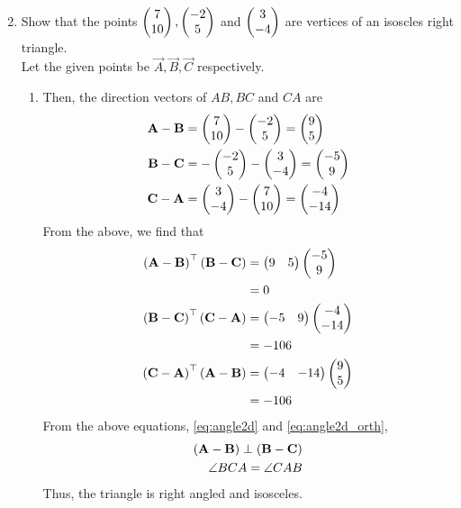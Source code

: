 \documentclass[journal,12pt,twocolumn]{IEEEtran}
\renewcommand\thesection{\arabic{section}}
\begin{document}
\begin{enumerate}[label=\thesection.\arabic*.,ref=\thesection.\theenumi]
\begin{enumerate}
\begin{align}
		\end{align}
		\end{enumerate}
	\item   Show that the points $\begin{pmatrix}7 \\ 10\end{pmatrix}, \begin{pmatrix}-2 \\ 5\end{pmatrix} $ and $\begin{pmatrix}3 \\ -4\end{pmatrix}$ are vertices of an isoscles right triangle.
		\\
		\solution Let the given points be $\vec{A}, \vec{B}, \vec{C}$ respectively. 
		\begin{enumerate}
			\item Then, the direction vectors of $AB, BC$ and $CA$ are
		\begin{align}
			\mathbf{A} -\mathbf{B}&= \begin{pmatrix}7 \\ 10\end{pmatrix} -\begin{pmatrix}-2 \\ 5\end{pmatrix} = \begin{pmatrix}9 \\ 5\end{pmatrix}
			\\
			\mathbf{B} -\mathbf{C}&=  -\begin{pmatrix}-2 \\ 5\end{pmatrix}-\begin{pmatrix}3 \\ -4\end{pmatrix} = \begin{pmatrix}-5 \\ 9\end{pmatrix}
			\\
			\mathbf{C} -\mathbf{A}&= \begin{pmatrix}3 \\ -4\end{pmatrix} -\begin{pmatrix}7 \\ 10\end{pmatrix} = \begin{pmatrix}-4 \\ -14\end{pmatrix}
		\end{align}
		From the above,  we find that 
		\begin{align}
			\left(\mathbf{A} -\mathbf{B}\right)^{\top}\left(\mathbf{B} -\mathbf{C}\right)&=  \begin{pmatrix}9 & 5\end{pmatrix}\begin{pmatrix}-5 \\ 9\end{pmatrix}
			\\
			&=0
			\\
			\left(\mathbf{B} -\mathbf{C}\right)^{\top}\left(\mathbf{C} -\mathbf{A}\right)&=  \begin{pmatrix}-5 & 9\end{pmatrix}\begin{pmatrix}-4 \\ -14\end{pmatrix}
\\
			&=-106
			\\
			\left(\mathbf{C} -\mathbf{A}\right)^{\top}\left(\mathbf{A} -\mathbf{B}\right)&=  \begin{pmatrix}-4 & -14\end{pmatrix}\begin{pmatrix}9 \\ 5\end{pmatrix}
\\
			&=-106
		\end{align}
		From  the above equations, 
    \eqref{eq:angle2d} and 
    \eqref{eq:angle2d_orth},
		\begin{align}
			\left(\mathbf{A} -\mathbf{B}\right)\perp \left(\mathbf{B} -\mathbf{C}\right)
			\\
			\angle BCA = 
			\angle CAB  
		\end{align}
		Thus, the triangle is right angled and isosceles.

\end{enumerate}
\end{enumerate}
\end{document}
